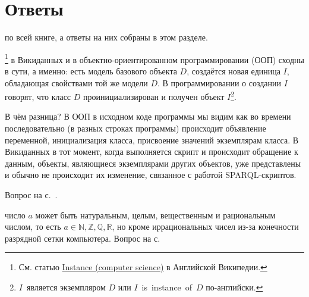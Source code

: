 \chapter{Ответы}
\label{ch:answers}


 по всей книге, а ответы на них собраны в этом разделе.

\begin{task}
    \label{answer:instance-in-OOP-vs-Wikidata}
    \footnote[][0cm]{См. статью 
        \href{https://en.wikipedia.org/wiki/Instance\_(computer\_science)}{Instance (computer science)} в Английской Википедии.
                                                  }%
    в Викиданных 
    и в объектно-ориентированном программировании (ООП) сходны в сути, а именно:
    есть модель базового объекта $D$, создаётся новая единица $I$, обладающая 
    свойствами той же модели $D$. 
    В программировании о создании $I$ говорят, 
    что класс $D$ проинициализирован 
    и получен объект $I$\footnote[][0cm]{%
        $I$~является экземпляром $D$ или 
        \mbox{$I$~is instance of $D$} по-английски.}. 

    В чём разница? 
    В ООП в исходном коде программы мы видим как во времени последовательно 
    (в разных строках программы) происходит 
    объявление переменной, инициализация класса, 
    присвоение значений экземплярам класса.
    В Викиданных в тот момент, когда выполняется скрипт и происходит обращение 
    к данным, объекты, являющиеся экземплярами других объектов, 
    уже представлены и обычно не происходит их изменение, 
    связанное с работой SPARQL-скриптов.

    \small{Вопрос на с.~\pageref{question:instance-in-OOP-vs-Wikidata}.}
\end{task}


\begin{task}
    \label{answer:guess_numbers_task}
     число $ a $ может быть натуральным, целым, вещественным и рациональным числом, то есть $ a \in \mathbb{N},\mathbb{Z}, \mathbb{Q}, \mathbb{R} $, но кроме иррациональных чисел из-за конечности разрядной сетки компьютера. 
    \small{Вопрос на с.~\pageref{question:text}}
\end{task}

